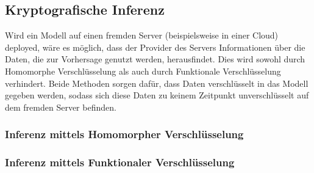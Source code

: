 \subsection{Kryptografische Inferenz}\label{sec:krypto_inferenz}

Wird ein Modell auf einen fremden Server (beispielsweise in einer Cloud) deployed, wäre es möglich, dass der Provider des Servers Informationen über die Daten, die zur Vorhersage genutzt werden, herausfindet.
Dies wird sowohl durch Homomorphe Verschlüsselung als auch durch Funktionale Verschlüsselung verhindert.
Beide Methoden sorgen dafür, dass Daten verschlüsselt in das Modell gegeben werden, sodass sich diese Daten zu keinem Zeitpunkt unverschlüsselt auf dem fremden Server befinden.

\subsubsection*{Inferenz mittels Homomorpher Verschlüsselung}

\subsubsection*{Inferenz mittels Funktionaler Verschlüsselung}



